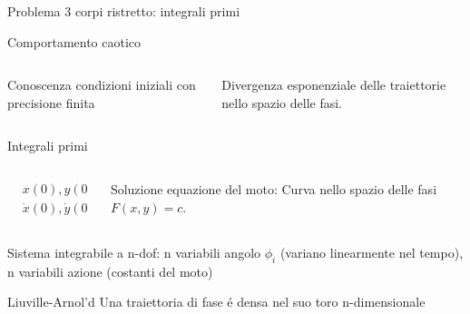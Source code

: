 \begin{frame}{Problema 3 corpi ristretto: integrali primi}
\begin{block}{Comportamento caotico}

\begin{columns}[T]

\begin{column}{0.5\textwidth}
Conoscenza condizioni iniziali con precisione finita
\end{column}

\begin{column}{0.5\textwidth}
Divergenza esponenziale delle traiettorie nello spazio delle fasi.
\end{column}

\end{columns}

\end{block}

\end{frame}

\begin{wordonframe}{Integrali primi}

\begin{columns}[T]
\begin{column}{0.5\textwidth}
\begin{align*}
&x(0),y(0)\\
&\dot{x}(0),\dot{y}(0)
\end{align*}
\end{column}

\begin{column}{0.5\textwidth}
Soluzione equazione del moto: Curva nello spazio delle fasi $F(x,y)=c$.
\end{column}

\end{columns}

Sistema integrabile a n-dof: n variabili angolo $\phi_i$ (variano linearmente nel tempo), n variabili azione (costanti del moto)

\begin{block}{Liuville-Arnol'd}
Una traiettoria di fase \'e densa nel suo toro n-dimensionale
\end{block}

\end{wordonframe}


